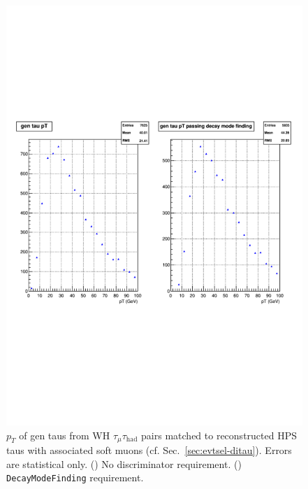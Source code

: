\begin{figure}[hbtp]
  \begin{center}
    \includegraphics[width=\cmsFigWidth]{figures/pT_whtt_DMF}
    \caption{$p_T$ of gen taus from WH $\tau_{\mu}\tau_{\text{had}}$ pairs matched to reconstructed HPS taus with associated soft muons (cf. Sec.~\ref{sec:evtsel-ditau}).  Errors are statistical only.  (\cmsLeft) No discriminator requirement.  (\cmsRight) \texttt{DecayModeFinding} requirement.}
    \label{fig:gen_whtt}
  \end{center}
\end{figure}

